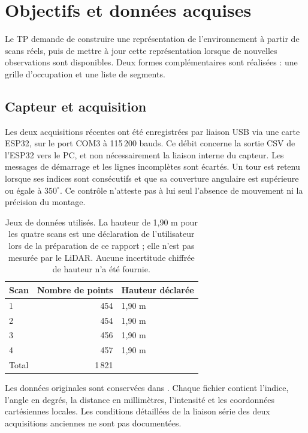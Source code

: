 \documentclass[11pt,a4paper]{article}
\begin{document}
\section{Objectifs et données acquises}
Le TP demande de construire une représentation de l'environnement à partir de scans réels, puis de mettre à jour cette représentation lorsque de nouvelles observations sont disponibles. Deux formes complémentaires sont réalisées : une grille d'occupation et une liste de segments.

\subsection{Capteur et acquisition}
Les deux acquisitions récentes ont été enregistrées par liaison USB via une carte ESP32, sur le port COM3 à 115\,200 bauds. Ce débit concerne la sortie CSV de l'ESP32 vers le PC, et non nécessairement la liaison interne du capteur. Les messages de démarrage et les lignes incomplètes sont écartés. Un tour est retenu lorsque ses indices sont consécutifs et que sa couverture angulaire est supérieure ou égale à $350^\circ$. Ce contrôle n'atteste pas à lui seul l'absence de mouvement ni la précision du montage.

\begin{table}[H]\centering
\begin{tabular}{lrl}
\toprule Scan & Nombre de points & Hauteur déclarée \\
\midrule
1 & 454 & 1,90 m \\
2 & 454 & 1,90 m \\
3 & 456 & 1,90 m \\
4 & 457 & 1,90 m \\
\midrule Total & 1\,821 & \\
\bottomrule
\end{tabular}
\caption{Jeux de données utilisés. La hauteur de 1,90 m pour les quatre scans est une déclaration de l'utilisateur lors de la préparation de ce rapport ; elle n'est pas mesurée par le LiDAR. Aucune incertitude chiffrée de hauteur n'a été fournie.}
\end{table}
Les données originales sont conservées dans . Chaque fichier contient l'indice, l'angle en degrés, la distance en millimètres, l'intensité et les coordonnées cartésiennes locales. Les conditions détaillées de la liaison série des deux acquisitions anciennes ne sont pas documentées.
\end{document}
